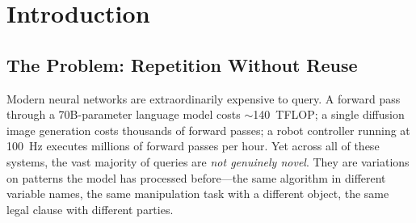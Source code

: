 \documentclass[11pt]{article}
\begin{document}
\begin{abstract}
We prove: (1)~expert libraries grow at rate $O(2^{H(P_{\mathcal{M}})} \log N)$
under stationary distributions (equivalently $O(\log N)$ for fixed-entropy
workloads); (2)~each new expert monotonically improves hit rate;
(3)~a fleet of $K$ cooperating units accumulates $K\times$ more observations
per day, converging to full coverage proportionally faster than a single unit; (4)~over-the-air (OTA) expert updates require $O(2^H \log \Delta N)$
bits per period, enabling $\approx 870$\,KB/day per robot for 1,000-unit fleets.  We also
prove \emph{energy savings bounds}: cache hits consume $O(n + k\,d_{\mathrm{model}})$ floating-point
operations versus $O(Ln^2 + Lnd_{\mathrm{model}})$ for a full forward pass, yielding up to $10^4\times$ energy reduction at high hit rates (Theorem~\ref{thm:energy}).

We discuss deployment on personal computers, local robots, and vehicles---devices
that can download only the experts they need on demand, learn from local
workloads, upload observations to a shared repository, and receive certified
domain intelligence as compact OTA updates.  We situate the Safebox/Safebots.ai
ecosystem~\cite{safebots} as one realization of this architecture, combining LAWS
experts with hardware-attested policy execution and declarative orchestration.
\end{abstract}

\tableofcontents
\newpage

\section{Introduction}
\label{sec:intro}

\subsection{The Problem: Repetition Without Reuse}

Modern neural networks are extraordinarily expensive to query.  A forward pass
through a 70B-parameter language model costs $\sim$140~TFLOP; a single diffusion
image generation costs thousands of forward passes; a robot controller running
at 100~Hz executes millions of forward passes per hour.  Yet across all of these
systems, the vast majority of queries are \emph{not genuinely novel}.  They are
variations on patterns the model has processed before---the same algorithm in
different variable names, the same manipulation task with a different object, the
same legal clause with different parties.
\end{document}
